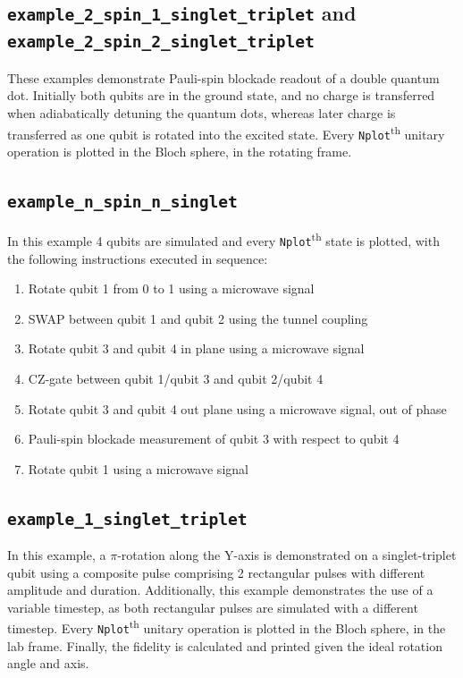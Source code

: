 \documentclass[10pt,a4paper,onecolumn,notitlepage]{article}
\begin{document}
\subsection{\lstinline{example_2_spin_1_singlet_triplet} and \lstinline{example_2_spin_2_singlet_triplet}}
These examples demonstrate Pauli-spin blockade readout of a double quantum dot. Initially both qubits are in the ground state, and no charge is transferred when adiabatically detuning the quantum dots, whereas later charge is transferred as one qubit is rotated into the excited state. Every \lstinline{Nplot}\textsuperscript{th} unitary operation is plotted in the Bloch sphere, in the rotating frame.

\subsection{\lstinline{example_n_spin_n_singlet}}
In this example 4 qubits are simulated and every \lstinline{Nplot}\textsuperscript{th} state is plotted, with the following instructions executed in sequence:
\begin{enumerate}
	\item Rotate qubit 1 from 0 to 1 using a microwave signal
	\item SWAP between qubit 1 and qubit 2 using the tunnel coupling
	\item Rotate qubit 3 and qubit 4 in plane using a microwave signal
	\item CZ-gate between qubit 1/qubit 3 and qubit 2/qubit 4
	\item Rotate qubit 3 and qubit 4 out plane using a microwave signal, out of phase
	\item Pauli-spin blockade measurement of qubit 3 with respect to qubit 4
	\item Rotate qubit 1 using a microwave signal
\end{enumerate}

\subsection{\lstinline{example_1_singlet_triplet}}
In this example, a $\pi$-rotation along the Y-axis is demonstrated on a singlet-triplet qubit using a composite pulse comprising 2 rectangular pulses with different amplitude and duration. Additionally, this example demonstrates the use of a variable timestep, as both rectangular pulses are simulated with a different timestep. Every \lstinline{Nplot}\textsuperscript{th} unitary operation is plotted in the Bloch sphere, in the lab frame. Finally, the fidelity is calculated and printed given the ideal rotation angle and axis.
\end{document}
